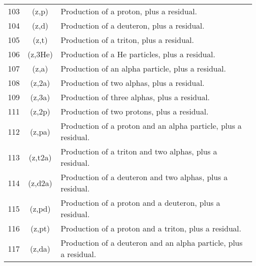 \begin{table}[h]
\begin{tabular}{| l | c | l |}
103	& (z,p)	   & Production of a proton, plus a residual.          \\
104	& (z,d)	   & Production of a deuteron, plus a residual.        \\
105	& (z,t)	   & Production of a triton, plus a residual.          \\
106	& (z,3He)	&    Production of a He particles, plus a residual.  \\
107	& (z,a)	  &  Production of an alpha particle, plus a residual. \\
108	& (z,2a)	& Production of two alphas, plus a residual.	\\
109	& (z,3a)	& Production of three alphas, plus a residual.	\\
111	& (z,2p)	& Production of two protons, plus a residual.	\\
112	& (z,pa)	& Production of a proton and an alpha particle, plus a residual.	\\
113	& (z,t2a)	& Production of a triton and two alphas, plus a residual.	\\
114	& (z,d2a)	& Production of a deuteron and two alphas, plus a residual.	\\
115	& (z,pd)	& Production of a proton and a deuteron, plus a residual.	\\
116	& (z,pt)	& Production of a proton and a triton, plus a residual.	\\
117	& (z,da)	& Production of a deuteron and an alpha particle, plus a residual.	\\
\hline
\end{tabular}
\end{table}
